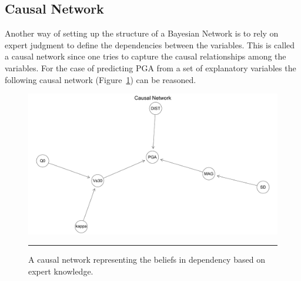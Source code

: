 \newpage

\subsection{Causal Network}

Another way of setting up the structure of a Bayesian Network is to rely on expert judgment to define the dependencies between the variables. This is called a causal network since one tries to capture the causal relationships among the variables. For the case of predicting PGA from a set of explanatory variables the following causal network (Figure~\ref{fig:causal}) can be reasoned.\\

\begin{figure}[!h]
	\centering
		\includegraphics[scale=0.33]{Figures/causal.pdf}
		\rule{35em}{0.5pt}
	\caption[Causal Network]{A causal network representing the beliefs in dependency based on expert knowledge.}
	\label{fig:causal}
\end{figure}

